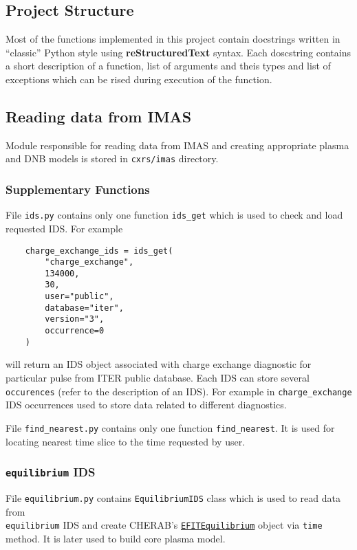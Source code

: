 \documentclass[../main.tex]{subfiles}
\begin{document}
\subsection{Project Structure}%
\label{sec:project_structure}

Most of the functions implemented in this project contain docstrings written in \enquote{classic} Python style using \textbf{reStructuredText} syntax. Each doscstring contains a short description of a function, list of arguments and theis types and list of exceptions which can be rised during execution of the function.

\subsection{Reading data from IMAS}%
\label{sec:reading_from_imas}

Module responsible for reading data from IMAS and creating appropriate plasma and DNB models is stored in \texttt{cxrs\//imas} directory.

\subsubsection{Supplementary Functions}%
\label{sec:imas_supp}
File \texttt{ids.py} contains only one function \texttt{ids\_get} which is used to check and load requested IDS. For example
\begin{verbatim}
    charge_exchange_ids = ids_get(
        "charge_exchange",
        134000,
        30,
        user="public",
        database="iter",
        version="3",
        occurrence=0
    )
\end{verbatim}
will return an IDS object associated with charge exchange diagnostic for particular pulse from ITER public database. Each IDS can store several \texttt{occurences} (refer to the description of an IDS). For example in \texttt{charge\_exchange} IDS occurrences used to store data related to different diagnostics.

File \texttt{find\_nearest.py} contains only one function \texttt{find\_nearest}. It is used for locating nearest time slice to the time requested by user.

\subsubsection{\texttt{equilibrium} IDS}%
\label{sec:equilibrium_ids}

File \texttt{equilibrium.py} contains \texttt{EquilibriumIDS} class which is used to read data from \\ \texttt{equilibrium} IDS and create CHERAB's \href{https://cherab.github.io/documentation/plasmas/equilibrium.html?highlight=efit#cherab.tools.equilibrium.efit.EFITEquilibrium}{\texttt{EFITEquilibrium}} object via \texttt{time} method. It is later used to build core plasma model.
\end{document}
